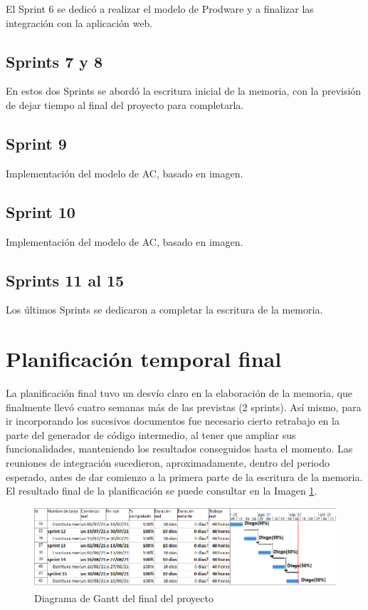 El Sprint 6 se dedicó a realizar el modelo de Prodware y a finalizar las integración con la aplicación web.

\subsection{Sprints 7 y 8}

En estos dos Sprints se abordó la escritura inicial de la memoria, con la previsión de dejar tiempo al final del proyecto para completarla.

\subsection{Sprint 9}

Implementación del modelo de AC, basado en imagen.

\subsection{Sprint 10}

Implementación del modelo de AC, basado en imagen.

\subsection{Sprints 11 al 15}

Los últimos Sprints se dedicaron a completar la escritura de la memoria.

\section{Planificación temporal final}

La planificación final tuvo un desvío claro en la elaboración de la memoria, que finalmente llevó cuatro semanas más de las previstas (2 sprints). Así mismo, para ir incorporando los sucesivos documentos fue necesario cierto retrabajo en la parte del generador de código intermedio, al tener que ampliar sus funcionalidades, manteniendo los resultados conseguidos hasta el momento. Las reuniones de integración sucedieron, aproximadamente, dentro del periodo esperado, antes de dar comienzo a la primera parte de la escritura de la memoria. El resultado final de la planificación se puede consultar en la Imagen \ref{fig:gantt-final}.

\begin{figure}[hp!]
	\centering
	\includegraphics[angle=0,width=1.0\textwidth]{imaxes/f-planificacion/gantt-final}
	\caption{Diagrama de Gantt del final del proyecto}
	\label{fig:gantt-final}
\end{figure}

